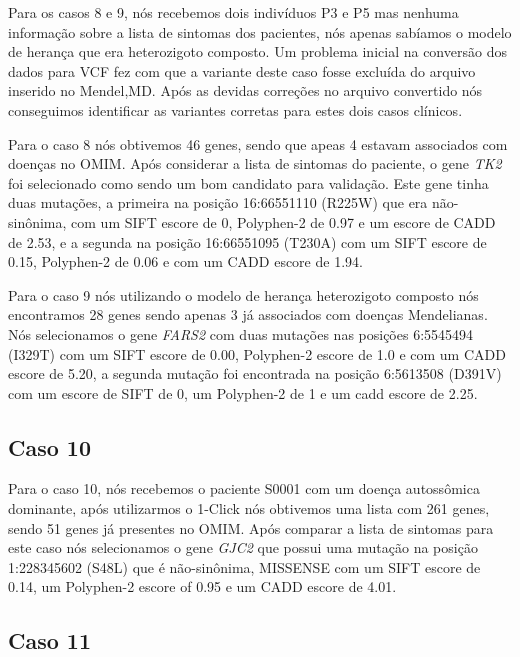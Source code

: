 Para os casos 8 e 9, nós recebemos dois indivíduos P3 e P5 mas nenhuma informação sobre a lista de sintomas dos pacientes, nós apenas sabíamos o modelo de herança que era heterozigoto composto. Um problema inicial na conversão dos dados para VCF fez com que a variante deste caso fosse excluída do arquivo inserido no Mendel,MD. Após as devidas correções no arquivo convertido nós conseguimos identificar as variantes corretas para estes dois casos clínicos.

Para o caso 8 nós obtivemos 46 genes, sendo que apeas 4 estavam associados com doenças no OMIM. Após considerar a lista de sintomas do paciente, o gene \textit{TK2} foi selecionado como sendo um bom candidato para validação. Este gene tinha duas mutações, a primeira na posição 16:66551110 (R225W) que era não-sinônima, com um SIFT escore de 0, Polyphen-2 de 0.97 e um escore de CADD de 2.53, e a segunda na posição 16:66551095 (T230A) com um SIFT escore de 0.15, Polyphen-2 de 0.06 e com um CADD escore de 1.94. 

Para o caso 9 nós utilizando o modelo de herança heterozigoto composto nós encontramos 28 genes sendo apenas 3 já associados com doenças Mendelianas. Nós selecionamos o gene \textit{FARS2} com duas mutações nas posições 6:5545494 (I329T) com um SIFT escore de 0.00, Polyphen-2 escore de 1.0 e com um CADD escore de 5.20, a segunda mutação foi encontrada na posição 6:5613508 (D391V) com um escore de SIFT de 0, um Polyphen-2 de 1 e um cadd escore de 2.25.

\subsection{Caso 10}

Para o caso 10, nós recebemos o paciente S0001 com um doença autossômica dominante, após utilizarmos o 1-Click nós obtivemos uma lista com 261 genes, sendo 51 genes já presentes no OMIM. Após comparar a lista de sintomas para este caso nós selecionamos o gene \textit{GJC2} que possui uma mutação na posição 1:228345602 (S48L) que é não-sinônima, MISSENSE com um SIFT escore de 0.14, um Polyphen-2 escore of 0.95 e um CADD escore de 4.01.

\subsection{Caso 11}

